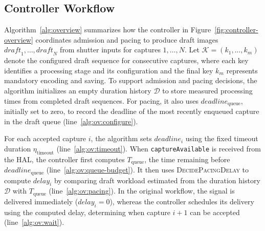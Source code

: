 \subsection{Controller Workflow}
\label{sec:workflow}

Algorithm~\ref{alg:overview} summarizes how the controller in Figure~\ref{fig:controller-overview} coordinates admission and pacing to produce draft images \(\mathit{draft}_1,\ldots,\mathit{draft}_N\) from shutter inputs for captures \(1,\ldots,N\).
Let \(\mathcal K=(k_1,\ldots,k_m)\) denote the configured draft sequence for consecutive captures, where each key identifies a processing stage and its configuration and the final key \(k_m\) represents mandatory encoding and saving.
To support admission and pacing decisions, the algorithm initializes an empty duration history \(\mathcal D\) to store measured processing times from completed draft sequences.
For pacing, it also uses \(\mathit{deadline}_{\mathrm{queue}}\), initially set to zero, to record the deadline of the most recently enqueued capture in the draft queue (line~\ref{alg:ov:configure}).



For each accepted capture \(i\), the algorithm sets \(\mathit{deadline}_i\) using the fixed timeout duration \(\eta_{\mathrm{timeout}}\) (line~\ref{alg:ov:timeout}).
When \texttt{captureAvailable} is received from the HAL, the controller first computes \(T_{\mathrm{queue}}\), the time remaining before \(\mathit{deadline}_{\mathrm{queue}}\) (line~\ref{alg:ov:queue-budget}).
It then uses \textsc{DecidePacingDelay} to compute \(\mathit{delay}_i\) by comparing draft workload estimated from the duration history \(\mathcal D\) with \(T_{\mathrm{queue}}\) (line~\ref{alg:ov:pacing}).
In the original workflow, the signal is delivered immediately (\(\mathit{delay}_i=0\)), whereas the controller schedules its delivery using the computed delay, determining when capture \(i+1\) can be accepted (line~\ref{alg:ov:wait}).

